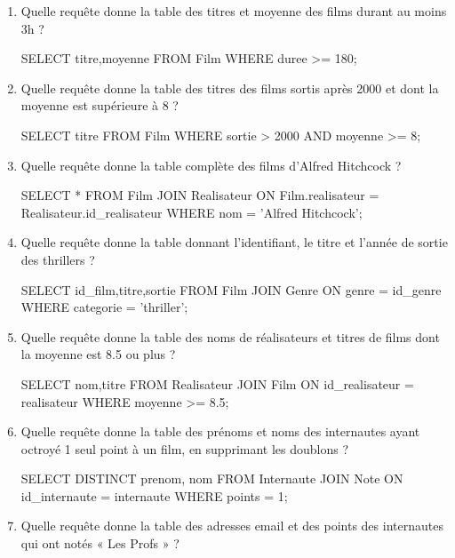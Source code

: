 \documentclass[a4paper,10pt]{article}
\begin{document}
\begin{enumerate}[\bfseries 1.]
\item Quelle requête donne la table des titres et moyenne des films durant au moins 3h ?
\begin{sql}
SELECT titre,moyenne FROM Film WHERE duree >= 180;
\end{sql}



\item Quelle requête donne la table des titres des films sortis après 2000 et dont la moyenne est supérieure à 8 ?
\begin{sql}
SELECT titre FROM Film WHERE sortie > 2000 AND moyenne >= 8;
\end{sql}

\item  Quelle requête donne la table complète des films d'Alfred Hitchcock ?\\
\begin{sql}
SELECT * FROM Film
    JOIN Realisateur ON Film.realisateur = Realisateur.id_realisateur
WHERE nom = 'Alfred Hitchcock';
\end{sql}

\item  Quelle requête donne la table donnant l'identifiant, le titre et l'année de sortie des thrillers ?

\begin{sql}
SELECT id_film,titre,sortie FROM Film
    JOIN Genre ON genre = id_genre
WHERE categorie = 'thriller';
\end{sql}

\item  Quelle requête donne la table des noms de réalisateurs et titres de films dont la moyenne est 8.5 ou plus ?

\begin{sql}
SELECT nom,titre FROM Realisateur
    JOIN Film ON id_realisateur = realisateur
WHERE moyenne >= 8.5;
\end{sql}

\item  Quelle requête donne la table des prénoms et noms des internautes ayant octroyé 1 seul point à un film,
en supprimant les doublons ?

\begin{sql}
SELECT DISTINCT prenom, nom FROM Internaute
    JOIN Note ON id_internaute = internaute
WHERE points = 1;
\end{sql}

\item Quelle requête donne la table des adresses email et des points des internautes qui ont notés « Les Profs » ?


\end{enumerate}
\end{document}
